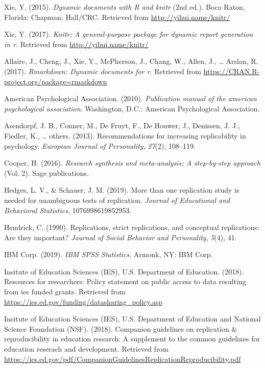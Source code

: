 \documentclass[
  english,
  ,man]{apa6}
\newlength{\cslhangindent}
\newenvironment{cslreferences}%
  {\setlength{\parindent}{0pt}%
  \everypar{\setlength{\hangindent}{\cslhangindent}}\ignorespaces}%
  {\par}
\begin{document}
\begin{cslreferences}
\leavevmode\hypertarget{ref-knitr}{}%
Xie, Y. (2015). \emph{Dynamic documents with R and knitr} (2nd ed.). Boca Raton, Florida: Chapman; Hall/CRC. Retrieved from \url{http://yihui.name/knitr/}

\leavevmode\hypertarget{ref-knitrmanual}{}%
Xie, Y. (2017). \emph{Knitr: A general-purpose package for dynamic report generation in r}. Retrieved from \url{http://yihui.name/knitr/}

\leavevmode\hypertarget{ref-rmarkdown}{}%
Allaire, J., Cheng, J., Xie, Y., McPherson, J., Chang, W., Allen, J., \ldots{} Arslan, R. (2017). \emph{Rmarkdown: Dynamic documents for r}. Retrieved from \url{https://CRAN.R-project.org/package=rmarkdown}

\leavevmode\hypertarget{ref-apa}{}%
American Psychological Association. (2010). \emph{Publication manual of the american psychological association}. Washington, D.C.: American Psychological Association.

\leavevmode\hypertarget{ref-asendorpf2013}{}%
Asendorpf, J. B., Conner, M., De Fruyt, F., De Houwer, J., Denissen, J. J., Fiedler, K., \ldots{} others. (2013). Recommendations for increasing replicability in psychology. \emph{European Journal of Personality}, \emph{27}(2), 108--119.

\leavevmode\hypertarget{ref-cooper2016}{}%
Cooper, H. (2016). \emph{Research synthesis and meta-analysis: A step-by-step approach} (Vol. 2). Sage publications.

\leavevmode\hypertarget{ref-hedges2019}{}%
Hedges, L. V., \& Schauer, J. M. (2019). More than one replication study is needed for unambiguous tests of replication. \emph{Journal of Educational and Behavioral Statistics}, 1076998619852953.

\leavevmode\hypertarget{ref-hendrick1990}{}%
Hendrick, C. (1990). Replications, strict replications, and conceptual replications: Are they important? \emph{Journal of Social Behavior and Personality}, \emph{5}(4), 41.

\leavevmode\hypertarget{ref-spss}{}%
IBM Corp. (2019). \emph{IBM SPSS Statistics}. Armonk, NY: IBM Corp.

\leavevmode\hypertarget{ref-iesdata}{}%
Insitute of Education Sciences (IES), U.S. Department of Education. (2018). Resources for researchers: Policy statement on public access to data resulting from ies funded grants. Retrieved from \url{https://ies.ed.gov/funding/datasharing_policy.asp}

\leavevmode\hypertarget{ref-iesrepro}{}%
Insitute of Education Sciences (IES), U.S. Department of Education and National Science Foundation (NSF). (2018). Companion guidelines on replication \& reproducibility in education research: A supplement to the common guidelines for education reserach and development. Retrieved from \url{https://ies.ed.gov/pdf/CompanionGuidelinesReplicationReproducibility.pdf}


\end{cslreferences}
\end{document}
